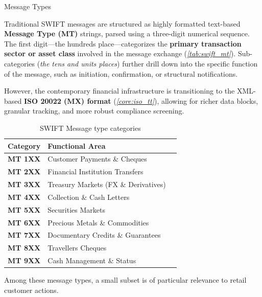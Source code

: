 \documentclass[10pt]{article}
\begin{document}
      \begin{core}[label=core:swift_mt]{Message Types}

        Traditional SWIFT messages are structured as highly formatted text-based \textbf{Message Type (MT)} strings, parsed using a three-digit numerical sequence. The first digit---the hundreds place---categorizes the \textbf{primary transaction sector or asset class} involved in the message exchange (\textit{\autoref{tab:swift_mt}}). Sub-categories (\textit{the tens and units places}) further drill down into the specific function of the message, such as initiation, confirmation, or structural notifications.

        However, the contemporary financial infrastructure is transitioning to the XML-based \textbf{ISO 20022 (MX) format} (\textit{\autoref{core:iso_tt}}), allowing for richer data blocks, granular tracking, and more robust compliance screening.

        \begin{table}[H]
          \centering
          \begin{tabular}{cll}
            \hline
            \textbf{Category} & \textbf{Functional Area} \\
            \hline
            \textbf{MT 1XX} & Customer Payments \& Cheques \\
            \textbf{MT 2XX} & Financial Institution Transfers \\
            \textbf{MT 3XX} & Treasury Markets (FX \& Derivatives) \\
            \textbf{MT 4XX} & Collection \& Cash Letters \\
            \textbf{MT 5XX} & Securities Markets \\
            \textbf{MT 6XX} & Precious Metals \& Commodities \\
            \textbf{MT 7XX} & Documentary Credits \& Guarantees \\
            \textbf{MT 8XX} & Travellers Cheques \\
            \textbf{MT 9XX} & Cash Management \& Status \\
            \hline
          \end{tabular}
          \caption{SWIFT Message type categories}
          \label{tab:swift_mt}
        \end{table}

      \end{core}

      Among these message types, a small subset is of particular relevance to retail customer actions.
\end{document}
